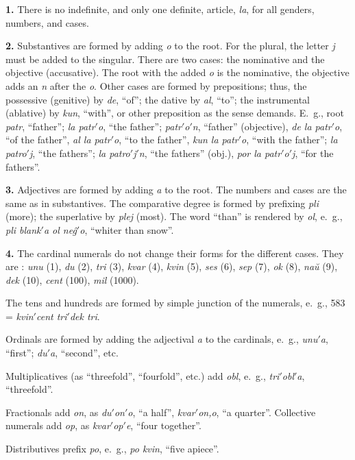 \textbf{1.} There is no indefinite, and only one definite, article, \emph{la}, for all genders, numbers, and cases.

\textbf{2.} Substantives are formed by adding \emph{o} to the root. For the plural, the letter \emph{j} must be added to the singular. There are two cases: the nominative and the objective (accusative). The root with the added \emph{o} is the nominative, the objective adds an \emph{n} after the \emph{o}. Other cases are formed by prepositions; thus, the possessive (genitive) by \emph{de}, “of”; the dative by \emph{al}, “to”; the instrumental (ablative) by \emph{kun}, “with”, or other preposition as the sense demands. E.~g., root \emph{patr}, “father”; \emph{la patr$'$o}, “the father”; \emph{patr$'$o$'$n}, “father” (objective), \emph{de la patr$'$o}, “of the father”, \emph{al la patr$'$o}, “to the father”, \emph{kun la patr$'$o}, “with the father”; \emph{la patro$'$j}, “the fathers”; \emph{la patro$'$j$'$n}, “the fathers” (obj.), \emph{por la patr$'$o$'$j}, “for the fathers”.

\textbf{3.} Adjectives are formed by adding \emph{a} to the root. The numbers and cases are the same as in substantives. The comparative degree is formed by prefixing \emph{pli} (more); the superlative by \emph{plej} (most). The word “than” is rendered by \emph{ol}, e.~g., \emph{pli blank$'$a ol neĝ$'$o}, “whiter than snow”.

\textbf{4.} The cardinal numerals do not change their forms for the different cases. They are :
\emph{unu} (1), \emph{du} (2), \emph{tri} (3), \emph{kvar} (4), \emph{kvin} (5), \emph{ses} (6), \emph{sep} (7), \emph{ok} (8), \emph{naŭ} (9), \emph{dek} (10), \emph{cent} (100), \emph{mil} (1000).

The tens and hundreds are formed by simple junction of the numerals, e.~g., 583 = \emph{kvin$'$cent tri$'$dek tri}.

Ordinals are formed by adding the adjectival \emph{a} to the cardinals, e.~g., \emph{unu$'$a}, “first”; \emph{du$'$a}, “second”, etc.

Multiplicatives (as “threefold”, “fourfold”, etc.) add \emph{obl}, e.~g., \emph{tri$'$obl$'$a}, “threefold”.

Fractionals add \emph{on}, as \emph{du$'$on$'$o}, “a half”, \emph{kvar$'$on,o}, “a quarter”. Collective numerals add \emph{op}, as \emph{kvar$'$op$'$e}, “four together”.

Distributives prefix \emph{po}, e.~g., \emph{po kvin}, “five apiece”.

